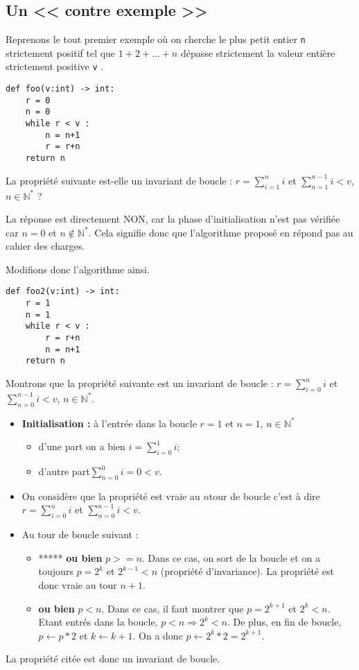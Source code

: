 \subsection{Un << contre exemple >>}


Reprenons le tout premier exemple où on cherche le plus petit entier \texttt{n} strictement positif tel que $1 + 2 + . . . + n$ dépasse strictement la valeur entière strictement positive \texttt{v} .
\begin{lstlisting}
def foo(v:int) -> int:
    r = 0
    n = 0
    while r < v : 
        n = n+1
        r = r+n
    return n
\end{lstlisting}

La propriété suivante est-elle un invariant de boucle : 
$r=\sum\limits_{i=1}^n i$ et 
$\sum\limits_{n=1}^{n-1} i < v$, 
$n\in\mathbb{N}^*$ ?

La réponse est directement NON, car la phase d'initialisation n'est pas vérifiée car $n=0$ et $n\notin\mathbb{N}^*$.
Cela signifie donc que l'algorithme proposé en répond pas au cahier des charges. 

Modifions donc l'algorithme ainsi.
\begin{lstlisting}
def foo2(v:int) -> int:
    r = 1
    n = 1
    while r < v : 
        r = r+n
        n = n+1
    return n
\end{lstlisting}

Montrons que la propriété suivante est un invariant de boucle : $r=\sum\limits_{i=0}^n i$ et 
$\sum\limits_{n=0}^{n-1} i < v$, 
$n\in\mathbb{N}^*$.

\begin{itemize}
\item \textbf{Initialisation : }à l'entrée dans la boucle $r=1$ et $n=1$, $n\in\mathbb{N}^*$
\begin{itemize}
\item d'une part  on a bien $i=\sum\limits_{i=0}^1 i$;
\item d'autre part$  \sum\limits_{n=0}^{0}i =0 < v$.
\end{itemize}
\item On considère que la propriété est vraie au $n$\ieme tour de boucle c'est à dire $r=\sum\limits_{i=0}^n i$ et $\sum\limits_{n=0}^{n-1} i < v$.
\item Au tour de boucle suivant : 
\begin{itemize}
\item ***** \textbf{ou bien} $p>=n$. Dans ce cas, on sort de la boucle et on a toujours $p=2^k$ et $2^{k-1}<n$ (propriété d'invariance). La propriété est donc vraie au tour $n+1$.
\item \textbf{ou bien} $p<n$. Dans ce cas, il faut montrer que  $p=2^{k+1}$ et $2^{k}<n$. Etant entrés dans la boucle, $p<n \Rightarrow 2^k<n$. De plus, en fin de boucle, $p\leftarrow p *2$ et $k\leftarrow k+1$. On a donc $p\leftarrow 2^k *2=2^{k+1}$. 
\end{itemize}
\end{itemize}
La propriété citée est donc un invariant de boucle. 

